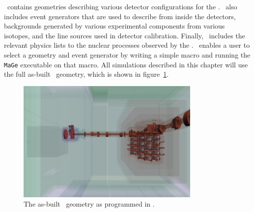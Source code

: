 \documentclass[/main.tex]{subfiles}
\begin{document}
\Mage\ contains geometries describing various detector configurations for the \MJD.
\Mage\ also includes event generators that are used to describe \bb from inside the detectors, backgrounds generated by various experimental components from various isotopes, and the line sources used in detector calibration.
Finally, \Mage\ includes the relevant physics lists to the nuclear processes observed by the \MJD.
\Mage\ enables a user to select a geometry and event generator by writing a simple macro and running the \texttt{MaGe} executable on that macro.
All simulations described in this chapter will use the full as-built \MJD\ geometry, which is shown in figure~\ref{fig:mageasbuilt}.
\\
\begin{figure}[h]
  \centering
  \includegraphics[width=0.8\textwidth]{Geant4Geom.jpeg}
  \caption[The \MJD\ as built simulated geometry]{\label{fig:mageasbuilt}
    The as-built \MJD\ geometry as programmed in \Mage.
  }
\end{figure}
\end{document}
